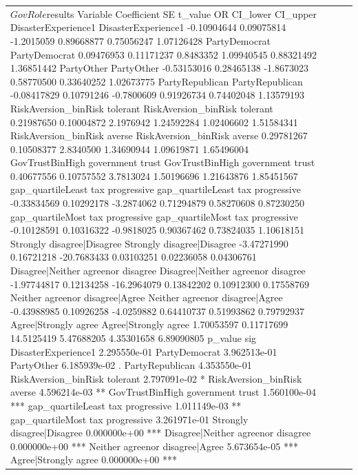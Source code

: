 \begin{table}[!h]
\begin{tabular}[t]{>{\raggedright\arraybackslash}p{6.4cm}ccc}
$GovRole$results
                                                             Variable Coefficient         SE     t_value         OR   CI_lower   CI_upper
DisasterExperience1                               DisasterExperience1 -0.10904644 0.09075814  -1.2015059 0.89668877 0.75056247 1.07126428
PartyDemocrat                                           PartyDemocrat  0.09476953 0.11171237   0.8483352 1.09940545 0.88321492 1.36851442
PartyOther                                                 PartyOther -0.53153016 0.28465138  -1.8673023 0.58770500 0.33640252 1.02673775
PartyRepublican                                       PartyRepublican -0.08417829 0.10791246  -0.7800609 0.91926734 0.74402048 1.13579193
RiskAversion_binRisk tolerant           RiskAversion_binRisk tolerant  0.21987650 0.10004872   2.1976942 1.24592284 1.02406602 1.51584341
RiskAversion_binRisk averse               RiskAversion_binRisk averse  0.29781267 0.10508377   2.8340500 1.34690944 1.09619871 1.65496004
GovTrustBinHigh government trust     GovTrustBinHigh government trust  0.40677556 0.10757552   3.7813024 1.50196696 1.21643876 1.85451567
gap_quartileLeast tax progressive   gap_quartileLeast tax progressive -0.33834569 0.10292178  -3.2874062 0.71294879 0.58270608 0.87230250
gap_quartileMost tax progressive     gap_quartileMost tax progressive -0.10128591 0.10316322  -0.9818025 0.90367462 0.73824035 1.10618151
Strongly disagree|Disagree                 Strongly disagree|Disagree -3.47271990 0.16721218 -20.7683433 0.03103251 0.02236058 0.04306761
Disagree|Neither agreenor disagree Disagree|Neither agreenor disagree -1.97744817 0.12134258 -16.2964079 0.13842202 0.10912300 0.17558769
Neither agreenor disagree|Agree       Neither agreenor disagree|Agree -0.43988985 0.10926258  -4.0259882 0.64410737 0.51993862 0.79792937
Agree|Strongly agree                             Agree|Strongly agree  1.70053597 0.11717699  14.5125419 5.47688205 4.35301658 6.89090805
                                        p_value sig
DisasterExperience1                2.295550e-01    
PartyDemocrat                      3.962513e-01    
PartyOther                         6.185939e-02   .
PartyRepublican                    4.353550e-01    
RiskAversion_binRisk tolerant      2.797091e-02   *
RiskAversion_binRisk averse        4.596214e-03  **
GovTrustBinHigh government trust   1.560100e-04 ***
gap_quartileLeast tax progressive  1.011149e-03  **
gap_quartileMost tax progressive   3.261971e-01    
Strongly disagree|Disagree         0.000000e+00 ***
Disagree|Neither agreenor disagree 0.000000e+00 ***
Neither agreenor disagree|Agree    5.673654e-05 ***
Agree|Strongly agree               0.000000e+00 ***



\end{tabular}
\end{table}
